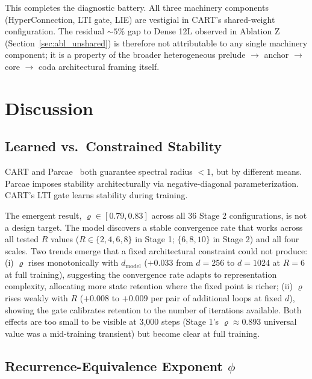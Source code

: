 \documentclass{article}
\newcommand{\cart}{\textsc{CART}}
\begin{document}
This completes the diagnostic battery. All three machinery components (HyperConnection, LTI gate, LIE) are vestigial in \cart{}'s shared-weight configuration. The residual $\sim 5\%$ gap to Dense 12L observed in Ablation Z (Section~\ref{sec:abl_unshared}) is therefore not attributable to any single machinery component; it is a property of the broader heterogeneous prelude $\to$ anchor $\to$ core $\to$ coda architectural framing itself.

\section{Discussion}
\label{sec:discussion}

\subsection{Learned vs.\ Constrained Stability}

\cart{} and Parcae~\citep{prairie2026parcae} both guarantee spectral radius $< 1$, but by different means. Parcae imposes stability architecturally via negative-diagonal parameterization. \cart{}'s LTI gate learns stability during training.

The emergent result, $\varrho \in [0.79, 0.83]$ across all 36 Stage 2 configurations, is not a design target. The model discovers a stable convergence rate that works across all tested $R$ values ($R \in \{2, 4, 6, 8\}$ in Stage 1; $\{6, 8, 10\}$ in Stage 2) and all four scales. Two trends emerge that a fixed architectural constraint could not produce: (i) $\varrho$ rises monotonically with $d_\text{model}$ ($+0.033$ from $d{=}256$ to $d{=}1024$ at $R{=}6$ at full training), suggesting the convergence rate adapts to representation complexity, allocating more state retention where the fixed point is richer; (ii) $\varrho$ rises weakly with $R$ ($+0.008$ to $+0.009$ per pair of additional loops at fixed $d$), showing the gate calibrates retention to the number of iterations available. Both effects are too small to be visible at 3{,}000 steps (Stage 1's $\varrho \approx 0.893$ universal value was a mid-training transient) but become clear at full training.

\subsection{Recurrence-Equivalence Exponent \texorpdfstring{$\phi$}{phi}}
\label{sec:phi}
\end{document}
